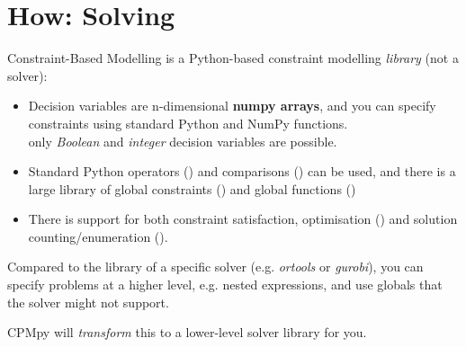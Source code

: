 \documentclass{cons-beamer}
\begin{document}
\section{How: Solving}


\begin{flashcardcpmpy}
	\begin{frame}{Constraint-Based Modelling}
		 is a Python-based constraint modelling
		\emph{library} (\alert{not a solver}): \vfill
		\begin{itemize}
			\item Decision variables are n-dimensional \textbf{numpy arrays}, and you can specify constraints using standard Python and NumPy functions.\\
			only \textit{Boolean} and \textit{integer} decision variables are possible. \vfill
			
			\item Standard Python operators () and comparisons (\cpminline{== >= > != <= <}) can be used, and there is a large library of global constraints () and global functions () \vfill
			
			\item There is support for both constraint satisfaction, optimisation () and solution counting/enumeration (). \vfill
		\end{itemize}
		
		Compared to the library of a specific solver (e.g. \textit{ortools} or \textit{gurobi}), you can specify problems at a higher level, e.g. nested expressions, and use globals that the solver might not support.
		
		CPMpy will \textit{transform} this to a lower-level solver library for you.
	\end{frame}
\end{flashcardcpmpy}
\end{document}
